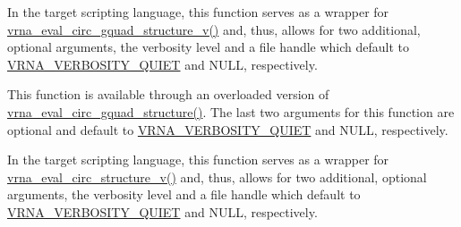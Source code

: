 \begin{DoxyRefList}
\item[Global \mbox{\hyperlink{group__eval_ga9dba2fc5d7e6ad1359a7c2f350589c0e}{vrna\+\_\+eval\+\_\+circ\+\_\+gquad\+\_\+structure}} (const char $\ast$string, const char $\ast$structure)]\label{wrappers__wrappers000056}%
%
 In the target scripting language, this function serves as a wrapper for \mbox{\hyperlink{group__eval_gab96a6c59923ff06c35f8c2fd2c239727}{vrna\+\_\+eval\+\_\+circ\+\_\+gquad\+\_\+structure\+\_\+v()}} and, thus, allows for two additional, optional arguments, the verbosity level and a file handle which default to \mbox{\hyperlink{group__eval_gaf4afe19780b61b4962c613bde324128b}{V\+R\+N\+A\+\_\+\+V\+E\+R\+B\+O\+S\+I\+T\+Y\+\_\+\+Q\+U\+I\+ET}} and N\+U\+LL, respectively.  
\item[Global \mbox{\hyperlink{group__eval_gab96a6c59923ff06c35f8c2fd2c239727}{vrna\+\_\+eval\+\_\+circ\+\_\+gquad\+\_\+structure\+\_\+v}} (const char $\ast$string, const char $\ast$structure, int verbosity\+\_\+level, F\+I\+LE $\ast$file)]\label{wrappers__wrappers000066}%
%
 This function is available through an overloaded version of \mbox{\hyperlink{group__eval_ga9dba2fc5d7e6ad1359a7c2f350589c0e}{vrna\+\_\+eval\+\_\+circ\+\_\+gquad\+\_\+structure()}}. The last two arguments for this function are optional and default to \mbox{\hyperlink{group__eval_gaf4afe19780b61b4962c613bde324128b}{V\+R\+N\+A\+\_\+\+V\+E\+R\+B\+O\+S\+I\+T\+Y\+\_\+\+Q\+U\+I\+ET}} and N\+U\+LL, respectively.  
\item[Global \mbox{\hyperlink{group__eval_ga3e05a23ddf9b083f4e69881e440d4866}{vrna\+\_\+eval\+\_\+circ\+\_\+structure}} (const char $\ast$string, const char $\ast$structure)]\label{wrappers__wrappers000054}%
%
 In the target scripting language, this function serves as a wrapper for \mbox{\hyperlink{group__eval_gac3fb44e0773a51be8efc5f4f595a94a7}{vrna\+\_\+eval\+\_\+circ\+\_\+structure\+\_\+v()}} and, thus, allows for two additional, optional arguments, the verbosity level and a file handle which default to \mbox{\hyperlink{group__eval_gaf4afe19780b61b4962c613bde324128b}{V\+R\+N\+A\+\_\+\+V\+E\+R\+B\+O\+S\+I\+T\+Y\+\_\+\+Q\+U\+I\+ET}} and N\+U\+LL, respectively.  
\item[Global \mbox{\hyperlink{group__eval_gac3fb44e0773a51be8efc5f4f595a94a7}{vrna\+\_\+eval\+\_\+circ\+\_\+structure\+\_\+v}} (const char $\ast$string, const char $\ast$structure, int verbosity\+\_\+level, F\+I\+LE $\ast$file)]\label{wrappers__wrappers000064}%
%

\end{DoxyRefList}
